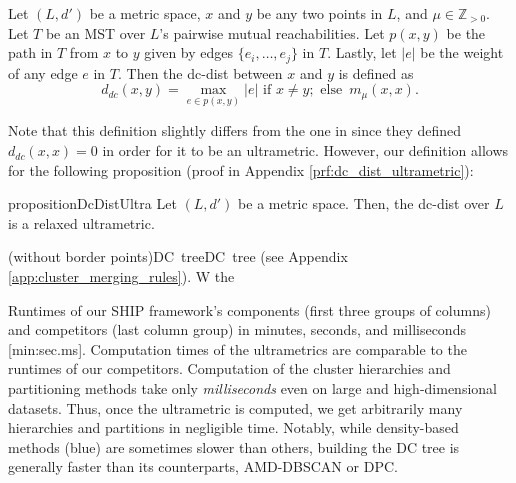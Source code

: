 \begin{definition}
    Let $(L, d')$ be a metric space, $x$ and $y$ be any two points in $L$, and $\mu \in \mathbb{Z}_{>0}$. Let $T$ be an MST over $L$'s pairwise mutual reachabilities. Let $p(x, y)$ be the path in $T$ from $x$ to $y$ given by edges $\{e_i, \ldots, e_j\}$ in $T$. Lastly, let $|e|$ be the weight of any edge $e$ in $T$. Then the dc-dist between $x$ and $y$ is defined as
    \[ d_{dc}(x, y) = \max_{e \in p(x, y)} |e| \text{ if } x \neq y; \,\, \text{else } \, m_{\mu}(x, x).\]
\end{definition}

Note that this definition slightly differs from the one in \citet{beer2023connecting} since they defined $d_{dc}(x, x) = 0$ in order for it to be an ultrametric. However, our definition allows for the following proposition (proof in Appendix \ref{prf:dc_dist_ultrametric}):

\begin{restatable}{proposition}{DcDistUltra}
    \label{fact:dc_dist_ultrametric}
    Let $(L, d')$ be a metric space. Then, the dc-dist over $L$ is a relaxed ultrametric.
\end{restatable}

 (without border points)\mbox{DC~tree$$}\mbox{DC~tree$$} (see Appendix \ref{app:cluster_merging_rules}). 
W the

\begin{table*}[b!]
    \centering
    \caption{
        Runtimes of our SHIP framework's components (first three groups of columns) and competitors (last column group) in minutes, seconds, and milliseconds [min:sec.ms].
        Computation times of the ultrametrics are comparable to the runtimes of our competitors. Computation of the cluster hierarchies and partitioning methods take only \emph{milliseconds} even on large and high-dimensional datasets. Thus, once the ultrametric is computed, we get arbitrarily many hierarchies and partitions in negligible time. Notably, while density-based methods (blue) are sometimes slower than others, building the DC tree is generally faster than its counterparts, AMD-DBSCAN or DPC.
    }
    \label{tbl:runtimes}
    \vspace{0.5em}
    
\end{table*}



